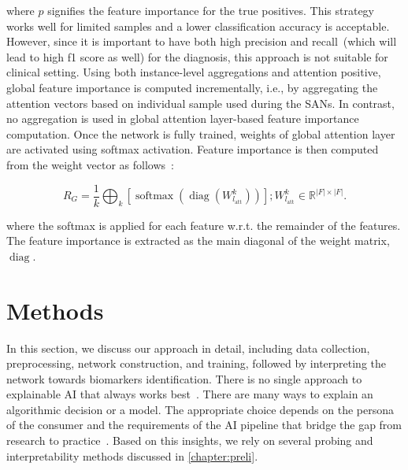 \hspace*{3.5mm} where $p$ signifies the feature importance for the true positives. This strategy works well for limited samples and a lower classification accuracy is acceptable. However, since it is important to have both high precision and recall~(which will lead to high f1 score as well) for the diagnosis, this approach is not suitable for clinical setting. Using both instance-level aggregations and attention positive, global feature importance is computed incrementally, i.e., by aggregating the attention vectors based on individual sample used during the SANs. In contrast, no aggregation is used in global attention layer-based feature importance computation. Once the network is fully trained, weights of global attention layer are activated using softmax activation. Feature importance is then computed from the weight vector as follows~\cite{vskrlj2020feature}:

\begin{equation}
    R_{G}=\frac{1}{k} \bigoplus_{k}\left[\operatorname{softmax}\left(\operatorname{diag}\left(W_{l_{\mathrm{att}}}^{k}\right)\right)\right] ; W_{l_{\mathrm{att}}}^{k} \in \mathbb{R}^{|F| \times|F|}.
    \label{eq:gal_k}
\end{equation}

\hspace*{3.5mm} where the softmax is applied for each feature w.r.t. the remainder of the features. The feature importance is extracted as the main diagonal of the weight matrix, $\operatorname{diag}$. 


\section{Methods}\label{chapter_5:mm}
In this section, we discuss our approach in detail, including data collection, preprocessing, network construction, and training, followed by interpreting the network towards biomarkers identification. There is no single approach to explainable AI that always works best~\cite{arya2019one}. There are many ways to explain an algorithmic decision or a model. The appropriate choice depends on the persona of the consumer and the requirements of the AI pipeline that bridge the gap from research to practice~\cite{arya2019one}. Based on this insights, we rely on several probing and interpretability methods discussed in \cref{chapter:preli}. 

